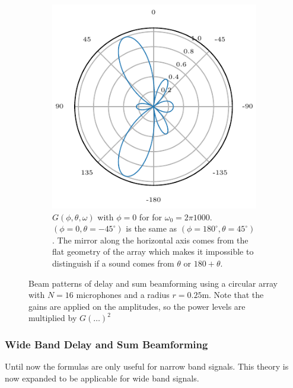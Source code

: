 \begin{figure}[ht]
\begin{subfigure}[t]{0.45\textwidth}
		\includegraphics[width=\textwidth]{images/3_source_localization/radial_1200_circ_theta_single.pdf}
		\caption{\(G(\phi, \theta, \omega)\) with $\phi = 0$ for for $\omega_0 = 2\pi 1000$.
			$(\phi= 0, \theta = -45^\circ)$ is the same as $(\phi= 180^\circ, \theta = 45^\circ)$.
			The mirror along the horizontal axis comes from the flat geometry of the array which makes
			it impossible to distinguish if a sound comes from $\theta$ or $180 + \theta$.}
		\label{ssl:fig:CircBmTheta}
	\end{subfigure}
	\caption{Beam patterns of delay and sum beamforming using a circular array with $N=16$ microphones
		and a radius $r = 0.25$m. Note that the gains are applied on the amplitudes, so the
		power levels are multiplied by $G(\dots)^2$}
	\label{ssl:fig:CircBmResponse}
\end{figure}

\subsubsection{Wide Band Delay and Sum Beamforming}
Until now the formulas are only useful for narrow band signals.
This theory is now expanded to be applicable for wide band signals.

